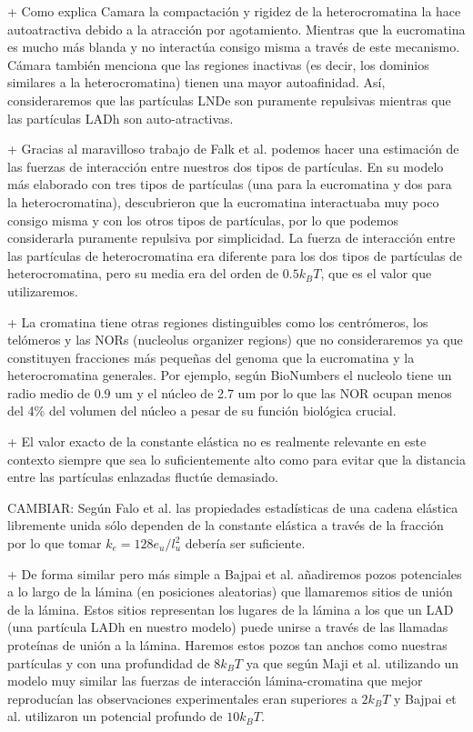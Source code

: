 + Como explica Camara la compactación y rigidez de la heterocromatina la hace autoatractiva debido a la atracción por agotamiento. Mientras que la eucromatina es mucho más blanda y no interactúa consigo misma a través de este mecanismo. Cámara también menciona que las regiones inactivas (es decir, los dominios similares a la heterocromatina) tienen una mayor autoafinidad. Así, consideraremos que las partículas LNDe son puramente repulsivas mientras que las partículas LADh son auto-atractivas.

+ Gracias al maravilloso trabajo de Falk et al. podemos hacer una estimación de las fuerzas de interacción entre nuestros dos tipos de partículas. En su modelo más elaborado con tres tipos de partículas (una para la eucromatina y dos para la heterocromatina), descubrieron que la eucromatina interactuaba muy poco consigo misma y con los otros tipos de partículas, por lo que podemos considerarla puramente repulsiva por simplicidad. La fuerza de interacción entre las partículas de heterocromatina era diferente para los dos tipos de partículas de heterocromatina, pero su media era del orden de $0.5k_BT$, que es el valor que utilizaremos.

+ La cromatina tiene otras regiones distinguibles como los centrómeros, los telómeros y las NORs (nucleolus organizer regions) que no consideraremos ya que constituyen fracciones más pequeñas del genoma que la eucromatina y la heterocromatina generales. Por ejemplo, según BioNumbers el nucleolo tiene un radio medio de 0.9 $\text{um}$ y el núcleo de 2.7 $\text{um}$ por lo que las NOR ocupan menos del 4\% del volumen del núcleo a pesar de su función biológica crucial.

+ El valor exacto de la constante elástica no es realmente relevante en este contexto siempre que sea lo suficientemente alto como para evitar que la distancia entre las partículas enlazadas fluctúe demasiado.

CAMBIAR: Según Falo et al. las propiedades estadísticas de una cadena elástica libremente unida sólo dependen de la constante elástica a través de la fracción por lo que tomar $k_e=128e_u/l_u^2$ debería ser suficiente.

+ De forma similar pero más simple a Bajpai et al. añadiremos pozos potenciales a lo largo de la lámina (en posiciones aleatorias) que llamaremos sitios de unión de la lámina. Estos sitios representan los lugares de la lámina a los que un LAD (una partícula LADh en nuestro modelo) puede unirse a través de las llamadas proteínas de unión a la lámina. Haremos estos pozos tan anchos como nuestras partículas y con una profundidad de $8k_BT$ ya que según Maji et al. utilizando un modelo muy similar las fuerzas de interacción lámina-cromatina que mejor reproducían las observaciones experimentales eran superiores a $2k_BT$ y Bajpai et al. utilizaron un potencial profundo de $10k_BT$.


